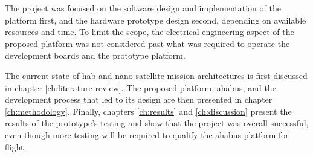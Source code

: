 The project was focused on the software design and implementation of the platform first, and the hardware prototype design second, depending on available resources and time. To limit the scope, the electrical engineering aspect of the proposed platform was not considered past what was required to operate the development boards and the prototype platform. 

The current state of \acrlong{hab} and nano-satellite mission architectures is first discussed in chapter \ref{ch:literature-review}. The proposed platform, \acrshort{ahabus}, and the development process that led to its design are then presented in chapter \ref{ch:methodology}. Finally, chapters \ref{ch:results} and \ref{ch:discussion} present the results of the prototype's testing and show that the project was overall successful, even though more testing will be required to qualify the \acrshort{ahabus} platform for flight.
